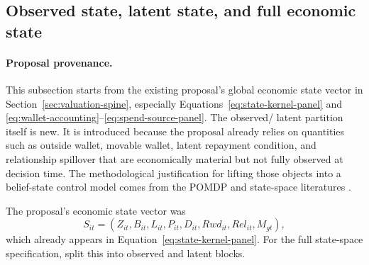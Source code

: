 \documentclass[11pt]{article}
\newcommand{\1}{\mathbf{1}}
\begin{document}
\subsection{Observed state, latent state, and full economic state}
\label{subsec:state-space-state-decomp}

\paragraph{Proposal provenance.}
This subsection starts from the existing proposal's global economic state vector
in Section~\ref{sec:valuation-spine}, especially
Equations~\eqref{eq:state-kernel-panel} and
\eqref{eq:wallet-accounting}--\eqref{eq:spend-source-panel}. The observed/
latent partition itself is new. It is introduced because the proposal already
relies on quantities such as outside wallet, movable wallet, latent repayment
condition, and relationship spillover that are economically material but not
fully observed at decision time. The methodological justification for lifting
those objects into a belief-state control model comes from the POMDP and
state-space literatures
\citep{smallwood1973pomdp,kaelbling1998pomdp,durbinkoopman2012ssm,
westharrison1997bfdm}.

The proposal's economic state vector was
\begin{equation}
  S_{it}
  =
  (Z_{it},B_{it},L_{it},P_{it},D_{it},Rwd_{it},Rel_{it},M_{gt}),
  \label{eq:ss-proposal-state-recall}
\end{equation}
which already appears in Equation~\eqref{eq:state-kernel-panel}. For the full
state-space specification, split this into observed and latent blocks.
\end{document}
